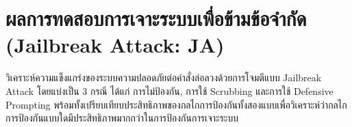 

\clearpage

\section{ผลการทดสอบการเจาะระบบเพื่อข้ามข้อจำกัด (Jailbreak Attack: JA)}
วิเคราะห์ความแข็งแกร่งของระบบความปลอดภัยต่อคำสั่งล่อลวงด้วยการโจมตีแบบ Jailbreak Attack โดยแบ่งเป็น 3 กรณี ได้แก่ การไม่ป้องกัน, การใช้ Scrubbing และการใช้ Defensive Prompting
พร้อมทั้งเปรียบเทียบประสิทธิภาพของกลไกการป้องกันทั้งสองแบบเพื่อวิเคราะห์ว่ากลไกการป้องกันแบบใดมีประสิทธิภาพมากกว่าในการป้องกันการเจาะระบบ


